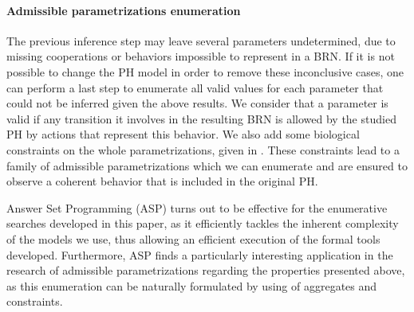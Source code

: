 \paragraph{Admissible parametrizations enumeration}\label{ssec:admissible-K}
The previous inference step may leave several parameters undetermined, due to missing cooperations or behaviors impossible to represent in a BRN.
If it is not possible to change the PH model in order to remove these inconclusive cases,
one can perform a last step to enumerate all valid values for each parameter that could not be inferred given the above results.
We consider that a parameter is valid if any transition it involves in the resulting BRN is allowed by the studied PH by actions that represent this behavior.
We also add some biological constraints on the whole parametrizations, given in \cite{BernotSemBRN}.
These constraints lead to a family of admissible parametrizations which we can enumerate and are ensured to observe a coherent behavior that is included in the original PH.

Answer Set Programming (ASP) \cite{Baral03} turns out to be effective for the enumerative searches developed in this paper,
as it efficiently tackles the inherent complexity of the models we use, thus allowing an efficient execution of the formal tools developed.
Furthermore, ASP finds a particularly interesting application in the research of admissible parametrizations regarding the properties presented above, as this enumeration can be naturally formulated by using of aggregates and constraints.

